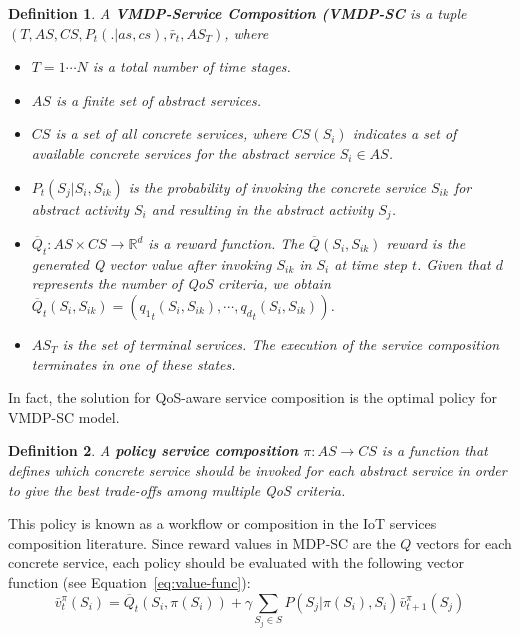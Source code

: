 \documentclass[10pt,journal,compsoc]{IEEEtran}
\newtheorem{definition}{Definition}
\begin{document}
\begin{definition}
A \textbf{VMDP-Service Composition (VMDP-SC} is a tuple $(T, AS, CS, P_t(.|as,cs), \bar{r}_t, AS_T)$, where  

\begin{itemize}
\item[ -] $T= 1 \cdots N$ is a total number of time stages. 
\item[-] $AS$ is a finite set of abstract services.
\item[-] $CS$ is a set of all concrete services, where $CS(S_i)$ indicates a set of available concrete services for the abstract service $S_i \in AS$.
\item[-] $P_t(S_j | S_i, S_{ik} )$ is the probability of invoking the concrete service $S_{ik}$ for abstract activity $S_i$ and resulting in the abstract activity $S_j$.
\item[-] $ \overline{Q}_t: AS \times CS \longrightarrow \mathbb{R}^d$ is a reward function. The $\overline{Q}(S_i, S_{ik})$ reward is the generated Q vector value after invoking $S_{ik}$ in $S_i$ at time step $t$. Given that $d$ represents the number of QoS criteria, we obtain $\overline{Q}_t(S_i, S_{ik}) = ({q_1}_t(S_i, S_{ik}), \cdots, {q_d}_t(S_i, S_{ik}))$. 
\item[-] $AS_T$ is the set of terminal services. The execution of the service composition terminates in one of these states.
\end{itemize}

\label{def:vmdp-sc}
\end{definition}

In fact, the solution for QoS-aware service composition is the optimal policy for VMDP-SC model.

\begin{definition}
A \textbf{policy service composition} $\pi: AS \longrightarrow CS$ is a function that defines which concrete service should be invoked for each abstract service in order to give the best trade-offs among multiple QoS criteria. 
\end{definition}

This policy is known as a workflow or composition in the IoT services composition literature. Since reward values in MDP-SC are the $Q$ vectors for each concrete service, each policy should be evaluated with the following vector function (see Equation~\ref{eq:value-func}):
\begin{equation}
\bar{v}_t^{\pi}(S_i) = \overline{Q}_t(S_i, \pi(S_i)) + \gamma \sum_{S_j \in S} P(S_j | \pi(S_i), S_i) \bar{v}_{t+1}^{\pi}(S_j)
\end{equation}
\end{document}
